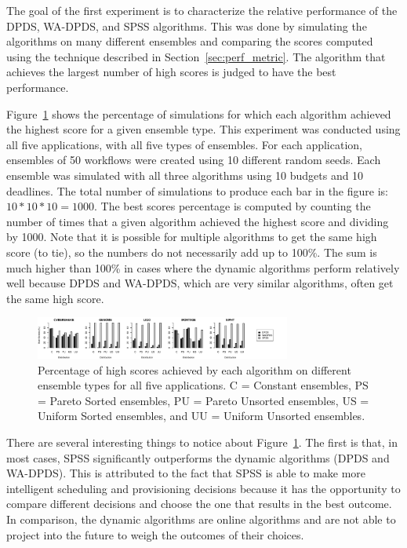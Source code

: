 \documentclass[conference]{IEEEtran}
\begin{document}
The goal of the first experiment is to characterize the relative performance of the DPDS, WA-DPDS, and SPSS algorithms. This was done by simulating the algorithms on many different ensembles and comparing the scores computed using the technique described in Section~\ref{sec:perf_metric}. The algorithm that achieves the largest number of high scores is judged to have the best performance.

Figure~\ref{fig:distributions} shows the percentage of simulations for which each algorithm achieved the highest score for a given ensemble type. This experiment was conducted using all five applications, with all five types of ensembles. For each application, ensembles of 50 workflows were created using 10 different random seeds. Each ensemble was simulated with all three algorithms using 10 budgets and 10 deadlines. The total number of simulations to produce each bar in the figure is: $10 * 10 * 10 = 1000$. The best scores percentage is computed by counting the number of times that a given algorithm achieved the highest score and dividing by 1000. Note that it is possible for multiple algorithms to get the same high score (to tie), so the numbers do not necessarily add up to 100\%. The sum is much higher than 100\% in cases where the dynamic algorithms perform relatively well because DPDS and WA-DPDS, which are very similar algorithms, often get the same high score.

\begin{figure}[ht]
    \centering
    \includegraphics[width=0.75\textwidth]{run-finish-variations-test-0-output-distributions}
    \caption[Percentage of high scores achieved by each algorithm on different ensemble types for all five applications.]{Percentage of high scores achieved by each algorithm on different ensemble types for all five applications. C = Constant ensembles, PS = Pareto Sorted ensembles, PU = Pareto Unsorted ensembles, US = Uniform Sorted ensembles, and UU = Uniform Unsorted ensembles.}
    \label{fig:distributions}
\end{figure}

There are several interesting things to notice about Figure~\ref{fig:distributions}. The first is that, in most cases, SPSS significantly outperforms the dynamic algorithms (DPDS and WA-DPDS). This is attributed to the fact that SPSS is able to make more intelligent scheduling and provisioning decisions because it has the opportunity to compare different decisions and choose the one that results in the best outcome. In comparison, the dynamic algorithms are online algorithms and are not able to project into the future to weigh the outcomes of their choices.
\end{document}
